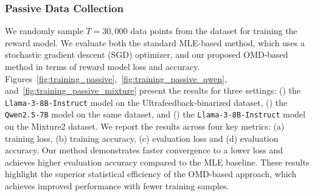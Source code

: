 \subsubsection{Passive Data Collection}

We randomly sample $T=30, 000$ data points from the dataset for training the reward model. We evaluate both the standard MLE-based method, which uses a stochastic gradient descent (SGD) optimizer, and our proposed OMD-based method in terms of reward model loss and accuracy. Figures~\ref{fig:training_passive},~\ref{fig:training_passive_qwen}, and~\ref{fig:training_passive_mixture} present the results for three settings: () the \texttt{Llama-3-8B-Instruct} model on the Ultrafeedback-binarized dataset, () the \texttt{Qwen2.5-7B} model on the same dataset, and () the \texttt{Llama-3-8B-Instruct} model on the Mixture2 dataset. We report the results across four key metrics: (a) training loss, (b) training accuracy, (c) evaluation loss and (d) evaluation accuracy.
 Our method demonstrates faster convergence to a lower loss and achieves higher evaluation accuracy compared to the MLE baseline. These results highlight the superior statistical efficiency of the OMD-based approach, which achieves improved performance with fewer training samples.


